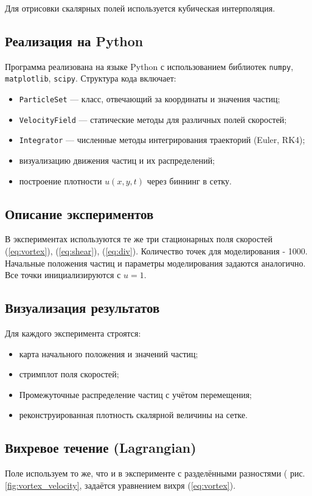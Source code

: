 Для отрисовки скалярных полей используется кубическая интерполяция.

\subsection{Реализация на Python}

Программа реализована на языке Python с использованием библиотек \texttt{numpy}, \texttt{matplotlib}, \texttt{scipy}. Структура кода включает:
\begin{itemize}
	\item \texttt{ParticleSet} — класс, отвечающий за координаты и значения частиц;
	\item \texttt{VelocityField} — статические методы для различных полей скоростей;
	\item \texttt{Integrator} — численные методы интегрирования траекторий (Euler, RK4);
	\item визуализацию движения частиц и их распределений;
	\item построение плотности \( u(x, y, t) \) через биннинг в сетку.
\end{itemize}

\subsection{Описание экспериментов}
В экспериментах используются те же три стационарных поля скоростей (\ref{eq:vortex}), (\ref{eq:shear}), (\ref{eq:div}).
Количество точек для моделирования - 1000.
Начальные положения частиц и параметры моделирования задаются аналогично. 
Все точки инициализируются с $u = 1$.

\subsection{Визуализация результатов}

Для каждого эксперимента строятся:
\begin{itemize}
	\item карта начального положения и значений частиц;
	\item стримплот поля скоростей;
	\item Промежуточные распределение частиц с учётом перемещения;
	\item реконструированная плотность скалярной величины на сетке.
\end{itemize}
\newpage
\subsection{Вихревое течение (Lagrangian)}
Поле используем то же, что и в эксперименте с разделёнными разностями ( рис. \ref{fig:vortex_velocity},  задаётся уравнением вихря (\ref{eq:vortex}).

